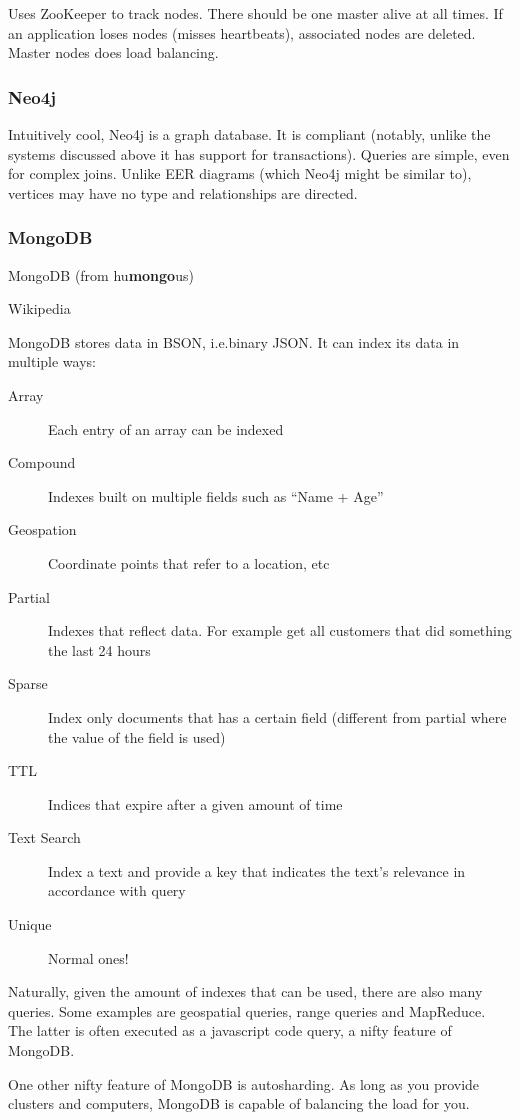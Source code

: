 Uses ZooKeeper to track nodes. There should be one master alive at all times.
If an application loses nodes (misses heartbeats), associated nodes are deleted.
Master nodes does load balancing.

\subsubsection{Neo4j}\label{sec:neo4j}
Intuitively cool, Neo4j is a graph database. It is  compliant (notably, unlike the systems discussed above it has support for transactions).
Queries are simple, even for complex joins. Unlike EER diagrams (which Neo4j might be
similar to), vertices may have no type and relationships are directed.


\subsubsection{MongoDB}\label{sec:mongodb}
\epigraph{MongoDB (from hu\textbf{mongo}us)}{Wikipedia}

MongoDB stores data in BSON, i.e.\@ binary JSON. It can index its data in multiple ways:
\begin{description}
    \item[Array] Each entry of an array can be indexed
    \item[Compound] Indexes built on multiple fields such as ``Name  + Age''
    \item[Geospation] Coordinate points that refer to a location, etc
    \item[Partial] Indexes that reflect data. For example get all customers that did something the last 24 hours
    \item[Sparse] Index only documents that has a certain field (different from partial where the value of the field is used)
    \item[TTL] Indices that expire after a given amount of time
    \item[Text Search] Index a text and provide a key that indicates the text's relevance in accordance with query
    \item[Unique] Normal ones!
\end{description}

Naturally, given the amount of indexes that can be used, there are also many queries.
Some examples are geospatial queries, range queries and MapReduce. The latter is often
executed as a javascript code query, a nifty feature of MongoDB.

One other nifty feature of MongoDB is autosharding. As long as you provide clusters
and computers, MongoDB is capable of balancing the load for you.

